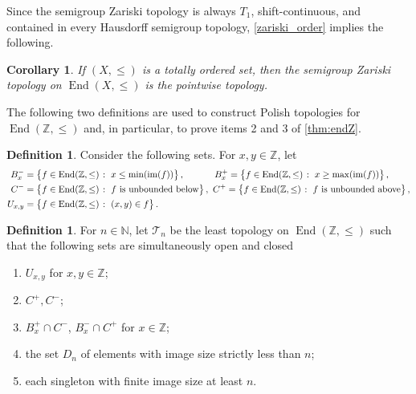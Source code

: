 \documentclass[11pt]{amsart}
\makeatletter
\newtheorem{corollary}[theorem]{Corollary}
\theoremstyle{definition}
\newtheorem{definition}[theorem]{Definition}
\newcommand{\N}{\mathbb N}
\newcommand{\Tau}{\mathcal T}
\newcommand{\Zendd}{\operatorname{End}(\mathbb Z, \leq)}
\newcommand{\Z}{\mathbb Z}
\newcommand{\im}{\operatorname{im}}
\newcommand{\makeset}[2]{\left\lbrace #1 \; \colon\;
 \begin{tabular}{@{}l@{}}
   #2
  \end{tabular}
  \right\rbrace}
\makeatother
\begin{document}
Since the semigroup Zariski topology is always \(T_1\), shift-continuous, and contained in every Hausdorff semigroup topology, \cref{zariski_order} implies the following.
\begin{corollary}
 If \((X, \leq)\) is a totally ordered set, then the semigroup Zariski topology on \(\operatorname{End}(X, \leq)\) is the pointwise topology.  
\end{corollary}

The following two definitions are used to construct Polish topologies for \(\operatorname{End}(\Z,\leq)\) and, in particular, to prove items 2 and 3 of \cref{thm:endZ}. 

\begin{definition}
Consider the  following sets.
For $x, y\in\Z$, let 
\begin{align*}
    B_x^-&=\makeset{f\in \Zendd}{\(x\leq\min(\im(f))\)},\quad\hspace{8mm} B_x^+=\makeset{f\in \Zendd}{\(x\geq\max(\im(f))\)},\\
    C^-&=\makeset{f\in \Zendd}{\(f\) is unbounded below},\ C^+=\makeset{f\in \Zendd}{\(f\) is unbounded above},\\
    U_{x,y}&=\makeset{f\in \Zendd}{\((x, y)\in f\)}.
\end{align*}
\end{definition}

\begin{definition}\label{Def71}
  For \(n\in \N\), let \(\Tau_n\) be the least topology on $\Zendd$ such that the following sets are simultaneously open and closed
  \begin{enumerate}[\rm (a)]
      \item \(U_{x,y}\) for \(x,y\in \Z\);
    \item \(C^{+},C^{-}\);
     \item \(B_{x}^{+}\cap C^{-}\), \(B_{x}^{-}\cap  C^{+}\) for \(x\in \Z\);
    \item the set $D_n$ of elements with image size strictly less than \(n\);
     \item each singleton with finite image size at least \(n\).
  \end{enumerate}
\end{definition}
\end{document}
